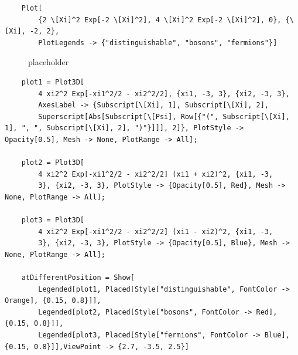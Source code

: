 \documentclass[11pt]{article}
\begin{document}

\pagestyle{fancy}
\fancyhf{}
\cfoot{\thepage}

\begin{lstlisting}
    Plot[
        {2 \[Xi]^2 Exp[-2 \[Xi]^2], 4 \[Xi]^2 Exp[-2 \[Xi]^2], 0}, {\[Xi], -2, 2},
        PlotLegends -> {"distinguishable", "bosons", "fermions"}]
\end{lstlisting}

\begin{figure}[h!] %
    \centering
    \caption{placeholder}
    \label{fig:fig1}
\end{figure}

\begin{lstlisting}
    plot1 = Plot3D[
        4 xi2^2 Exp[-xi1^2/2 - xi2^2/2], {xi1, -3, 3}, {xi2, -3, 3}, 
        AxesLabel -> {Subscript[\[Xi], 1], Subscript[\[Xi], 2], 
        Superscript[Abs[Subscript[\[Psi], Row[{"(", Subscript[\[Xi], 1], ", ", Subscript[\[Xi], 2], ")"}]]], 2]}, PlotStyle -> Opacity[0.5], Mesh -> None, PlotRange -> All];

    plot2 = Plot3D[
        4 xi2^2 Exp[-xi1^2/2 - xi2^2/2] (xi1 + xi2)^2, {xi1, -3, 
        3}, {xi2, -3, 3}, PlotStyle -> {Opacity[0.5], Red}, Mesh -> None, PlotRange -> All];

    plot3 = Plot3D[
        4 xi2^2 Exp[-xi1^2/2 - xi2^2/2] (xi1 - xi2)^2, {xi1, -3, 
        3}, {xi2, -3, 3}, PlotStyle -> {Opacity[0.5], Blue}, Mesh -> None, PlotRange -> All];

    atDifferentPosition = Show[
        Legended[plot1, Placed[Style["distinguishable", FontColor -> Orange], {0.15, 0.8}]], 
        Legended[plot2, Placed[Style["bosons", FontColor -> Red], {0.15, 0.8}]], 
        Legended[plot3, Placed[Style["fermions", FontColor -> Blue], {0.15, 0.8}]],ViewPoint -> {2.7, -3.5, 2.5}]
\end{lstlisting}
\end{document}

